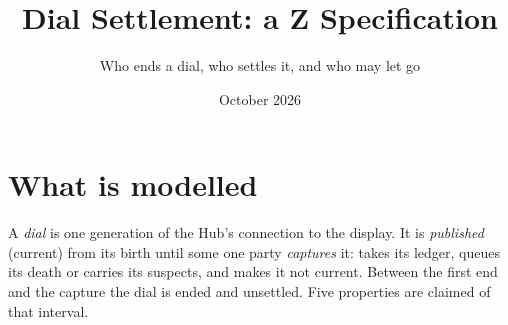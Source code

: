\documentclass[a4paper,10pt,fleqn]{article}
\begin{document}
\title{Dial Settlement: a Z Specification}
\author{Who ends a dial, who settles it, and who may let go}
\date{October 2026}
\maketitle

\section{What is modelled}

A \emph{dial} is one generation of the Hub's connection to the display.  It is
\emph{published} (current) from its birth until some one party \emph{captures}
it: takes its ledger, queues its death or carries its suspects, and makes it
not current.  Between the first end and the capture the dial is ended and
unsettled.  Five properties are claimed of that interval.
\end{document}
